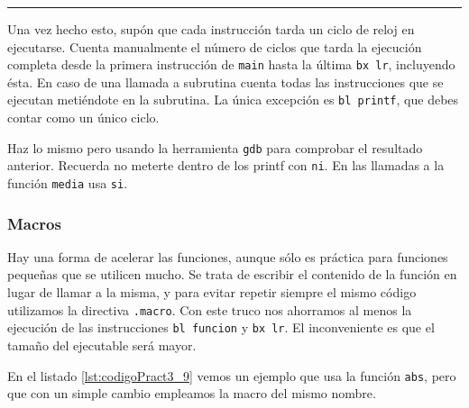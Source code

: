\begin{center}
\begin{myfbox}
\small
\begin{minipage}{0.92\linewidth}
\begin{center}
\colorbox[gray]{1}{\rule{0cm}{4.5cm}\rule{11cm}{0cm}}
\end{center}
\end{minipage}
\end{myfbox}
\end{center}

Una vez hecho esto, supón que cada instrucción tarda un ciclo de reloj en ejecutarse.
Cuenta manualmente el número de ciclos que tarda la ejecución completa desde la primera
instrucción de {\tt main} hasta la última {\tt bx lr}, incluyendo ésta. En caso de una
llamada a subrutina cuenta todas las instrucciones que se ejecutan metiéndote en la
subrutina. La única excepción es {\tt bl printf}, que debes contar como un único ciclo.

Haz lo mismo pero usando la herramienta {\tt gdb} para comprobar el resultado anterior.
Recuerda no meterte dentro de los printf con {\tt ni}. En las llamadas a la función
{\tt media} usa {\tt si}.

\subsubsection{Macros}

Hay una forma de acelerar las funciones, aunque sólo es práctica para funciones pequeñas
que se utilicen mucho. Se trata de escribir el contenido de la función en lugar de
llamar a la misma, y para evitar repetir siempre el mismo código utilizamos la directiva
{\tt .macro}. Con este truco nos ahorramos al menos la ejecución de las instrucciones
{\tt bl funcion} y {\tt bx lr}. El inconveniente es que el tamaño del ejecutable será
mayor.

En el listado \ref{lst:codigoPract3_9} vemos un ejemplo que usa la función {\tt abs},
pero que con un simple cambio empleamos la macro del mismo nombre.

